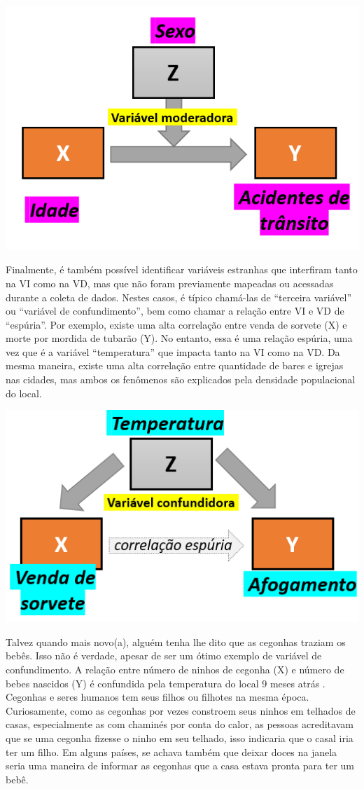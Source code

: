 \documentclass[
]{book}
\begin{document}
\includegraphics{./img/cap_moderacao.png}

Finalmente, é também possível identificar variáveis estranhas que interfiram tanto na VI como na VD, mas que não foram previamente mapeadas ou acessadas durante a coleta de dados. Nestes casos, é típico chamá-las de ``terceira variável'' ou ``variável de confundimento'', bem como chamar a relação entre VI e VD de ``espúria''. Por exemplo, existe uma alta correlação entre venda de sorvete (X) e morte por mordida de tubarão (Y). No entanto, essa é uma relação espúria, uma vez que é a variável ``temperatura'' que impacta tanto na VI como na VD. Da mesma maneira, existe uma alta correlação entre quantidade de bares e igrejas nas cidades, mas ambos os fenômenos são explicados pela densidade populacional do local.

\includegraphics{./img/cap_confundimento.png}

Talvez quando mais novo(a), alguém tenha lhe dito que as cegonhas traziam os bebês. Isso não é verdade, apesar de ser um ótimo exemplo de variável de confundimento. A relação entre número de ninhos de cegonha (X) e número de bebes nascidos (Y) é confundida pela temperatura do local 9 meses atrás \citep{Matthews2000}. Cegonhas e seres humanos tem seus filhos ou filhotes na mesma época. Curiosamente, como as cegonhas por vezes constroem seus ninhos em telhados de casas, especialmente as com chaminés por conta do calor, as pessoas acreditavam que se uma cegonha fizesse o ninho em seu telhado, isso indicaria que o casal iria ter um filho. Em alguns países, se achava também que deixar doces na janela seria uma maneira de informar as cegonhas que a casa estava pronta para ter um bebê.
\end{document}
